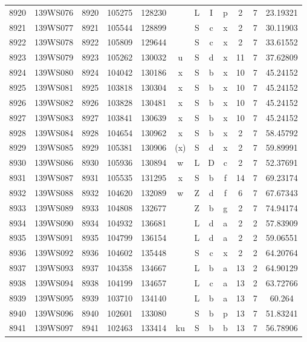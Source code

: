 \begin{tabular}{|*{12}{c|}}
8920 & 139WS076 & 8920 & 105275 & 128230 &  & L & I & p & 2 & 7 & 23.19321 \\ 
8921 & 139WS077 & 8921 & 105544 & 128899 &  & S & c & x & 2 & 7 & 30.11903 \\ 
8922 & 139WS078 & 8922 & 105809 & 129644 &  & S & c & x & 2 & 7 & 33.61552 \\ 
8923 & 139WS079 & 8923 & 105262 & 130032 & u & S & d & x & 11 & 7 & 37.62809 \\ 
8924 & 139WS080 & 8924 & 104042 & 130186 & x & S & b & x & 10 & 7 & 45.24152 \\ 
8925 & 139WS081 & 8925 & 103818 & 130304 & x & S & b & x & 10 & 7 & 45.24152 \\ 
8926 & 139WS082 & 8926 & 103828 & 130481 & x & S & b & x & 10 & 7 & 45.24152 \\ 
8927 & 139WS083 & 8927 & 103841 & 130639 & x & S & b & x & 10 & 7 & 45.24152 \\ 
8928 & 139WS084 & 8928 & 104654 & 130962 & x & S & b & x & 2 & 7 & 58.45792 \\ 
8929 & 139WS085 & 8929 & 105381 & 130906 & (x) & S & d & x & 2 & 7 & 59.89991 \\ 
8930 & 139WS086 & 8930 & 105936 & 130894 & w & L & D & c & 2 & 7 & 52.37691 \\ 
8931 & 139WS087 & 8931 & 105535 & 131295 & x & S & b & f & 14 & 7 & 69.23174 \\ 
8932 & 139WS088 & 8932 & 104620 & 132089 & w & Z & d & f & 6 & 7 & 67.67343 \\ 
8933 & 139WS089 & 8933 & 104808 & 132677 &  & Z & b & g & 2 & 7 & 74.94174 \\ 
8934 & 139WS090 & 8934 & 104932 & 136681 &  & L & d & a & 2 & 2 & 57.83909 \\ 
8935 & 139WS091 & 8935 & 104799 & 136154 &  & L & d & a & 2 & 2 & 59.06551 \\ 
8936 & 139WS092 & 8936 & 104602 & 135448 &  & S & c & x & 2 & 2 & 64.20764 \\ 
8937 & 139WS093 & 8937 & 104358 & 134667 &  & L & b & a & 13 & 2 & 64.90129 \\ 
8938 & 139WS094 & 8938 & 104199 & 134657 &  & L & c & a & 13 & 2 & 63.72766 \\ 
8939 & 139WS095 & 8939 & 103710 & 134140 &  & L & b & a & 13 & 7 & 60.264 \\ 
8940 & 139WS096 & 8940 & 102601 & 133080 &  & S & b & p & 13 & 7 & 51.83241 \\ 
8941 & 139WS097 & 8941 & 102463 & 133414 & ku & S & b & b & 13 & 7 & 56.78906 \\ 

\end{tabular}

